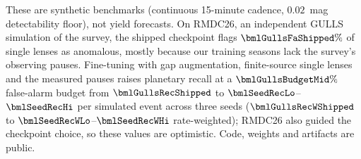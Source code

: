 %
%
%

These are synthetic benchmarks (continuous 15-minute
cadence, $0.02$~mag detectability floor), not yield forecasts. On RMDC26, an independent GULLS
simulation of the survey, the shipped checkpoint flags $\bmlGullsFaShipped\%$ of single lenses as anomalous,
mostly because our training seasons lack the survey's observing pauses. Fine-tuning with gap augmentation,
finite-source single lenses and the measured pauses raises planetary recall at a $\bmlGullsBudgetMid\%$
false-alarm budget from $\bmlGullsRecShipped$ to $\bmlSeedRecLo$--$\bmlSeedRecHi$ per simulated event across
three seeds ($\bmlGullsRecWShipped$ to $\bmlSeedRecWLo$--$\bmlSeedRecWHi$ rate-weighted); RMDC26
also guided the checkpoint choice, so these values are optimistic. Code, weights and artifacts are public.

